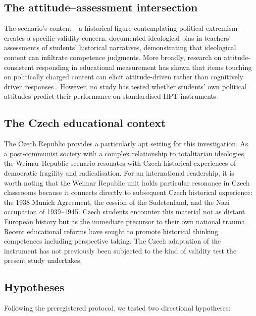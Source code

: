 \documentclass[pdflatex,sn-apa]{sn-jnl}%
\begin{document}
\subsection{The attitude--assessment intersection}\label{subsec:intersection}

The scenario's content---a historical figure contemplating political extremism---creates a specific validity concern. \citet{Alven2019} documented ideological bias in teachers' assessments of students' historical narratives, demonstrating that ideological content can infiltrate competence judgments. More broadly, research on attitude-consistent responding in educational measurement has shown that items touching on politically charged content can elicit attitude-driven rather than cognitively driven responses \citep{Badham2025}. However, no study has tested whether students' own political attitudes predict their performance on standardised HPT instruments.

\subsection{The Czech educational context}\label{subsec:czech}

The Czech Republic provides a particularly apt setting for this investigation. As a post-communist society with a complex relationship to totalitarian ideologies, the Weimar Republic scenario resonates with Czech historical experiences of democratic fragility and radicalisation. For an international readership, it is worth noting that the Weimar Republic unit holds particular resonance in Czech classrooms because it connects directly to subsequent Czech historical experience: the 1938 Munich Agreement, the cession of the Sudetenland, and the Nazi occupation of 1939--1945. Czech students encounter this material not as distant European history but as the immediate precursor to their own national trauma. Recent educational reforms have sought to promote historical thinking competences including perspective taking. The Czech adaptation of the \citet{Hartmann2008} instrument has not previously been subjected to the kind of validity test the present study undertakes.

\subsection{Hypotheses}\label{subsec:hypotheses}

Following the preregistered protocol, we tested two directional hypotheses:
\end{document}

